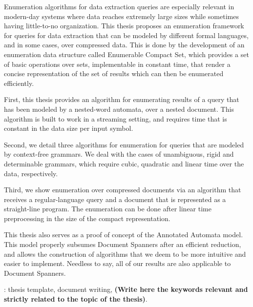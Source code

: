 \noindent Enumeration algorithms for data extraction queries are especially relevant in modern-day systems where data reaches extremely large sizes while sometimes having little-to-no organization.
This thesis proposes an enumeration framework for queries for data extraction that can be modeled by different formal languages, and in some cases, over compressed data. This is done by the development of an enumeration data structure called Enumerable Compact Set, which provides a set of basic operations over sets, implementable in constant time, that render a concise representation of the set of results which can then be enumerated efficiently.

\noindent First, this thesis provides an algorithm for enumerating results of a query that has been modeled by a nested-word automata, over a nested document. This algorithm is built to work in a streaming setting, and requires time that is constant in the data size per input symbol.

\noindent Second, we detail three algorithms for enumeration for queries that are modeled by context-free grammars. We deal with the cases of unambiguous, rigid and determinable grammars, which require cubic, quadratic and linear time over the data, respectively.

\noindent Third, we show enumeration over compressed documents via an algorithm that receives a regular-language query and a document that is represented as a straight-line program. The enumeration can be done after linear time preprocessing in the size of the compact representation.

\noindent This thesis also serves as a proof of concept of the Annotated Automata model. This model properly subsumes Document Spanners after an efficient reduction, and allows the construction of algorithms that we deem to be more intuitive and easier to implement. Needless to say, all of our results are also applicable to Document Spanners.

\vfill
{}:  thesis template, document writing, {\bf (Write here the keywords relevant and strictly related to the topic of the thesis)}.

